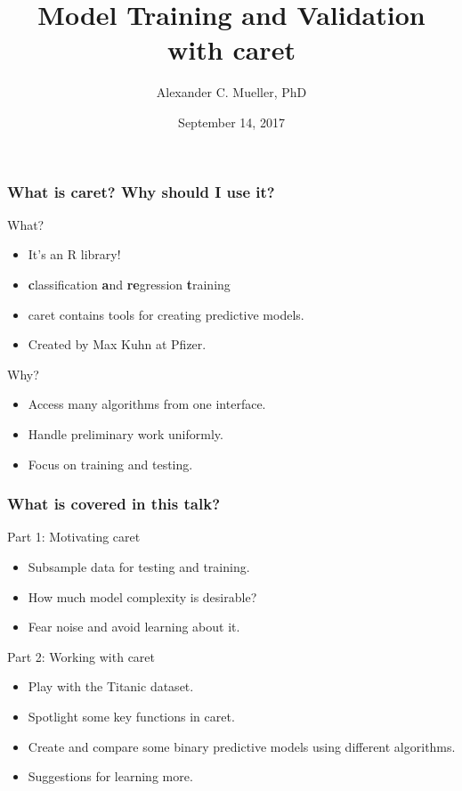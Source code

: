 \documentclass[presentation]{beamer}
\title[]{Model Training and Validation with caret}
\author[Alexander C. Mueller, PhD]{Alexander C. Mueller, PhD}
\date{September 14, 2017}
\begin{document}
\begin{frame}
\titlepage
\end{frame}

\begin{frame}
\frametitle{What is caret?  Why should I use it?}

What?
\begin{itemize}

\item It's an R library!
\item \textbf{c}lassification \textbf{a}nd \textbf{re}gression \textbf{t}raining
\item caret contains tools for creating predictive models.
\item Created by Max Kuhn at Pfizer.

\end{itemize}

Why?
\begin{itemize}

\item Access many algorithms from one interface.
\item Handle preliminary work uniformly.
\item Focus on training and testing.

\end{itemize}

\end{frame}


\begin{frame}
\frametitle{What is covered in this talk?}

Part 1: Motivating caret
\begin{itemize}

\item Subsample data for testing and training.
\item How much model complexity is desirable?
\item Fear noise and avoid learning about it.

\end{itemize}

Part 2: Working with caret
\begin{itemize}

\item Play with the Titanic dataset.
\item Spotlight some key functions in caret.
\item Create and compare some binary predictive models using different algorithms.
\item Suggestions for learning more.

\end{itemize}

\end{frame}
\end{document}
